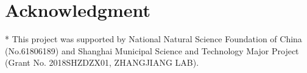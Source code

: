 \documentclass{cta-author}
\begin{document}
\section*{Acknowledgment}
* This project was supported by National Natural Science Foundation of China (No.61806189) and Shanghai Municipal Science and Technology Major Project (Grant No. 2018SHZDZX01, ZHANGJIANG LAB).





\end{document}
